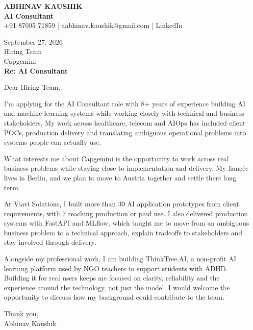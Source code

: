 \documentclass[10pt,a4paper]{article}
\begin{document}
\begin{center}
{\Large\bfseries ABHINAV KAUSHIK}\\[2pt]
{\bfseries AI Consultant}\\[2pt]
+91 87005 71859 \quad | \quad aabhinav.kaushik@gmail.com \quad | \quad LinkedIn
\end{center}
\vspace{8pt}
September 27, 2026\\[6pt]
Hiring Team\\
Capgemini\\[4pt]
\textbf{Re: AI Consultant}

Dear Hiring Team,

I’m applying for the AI Consultant role with 8+ years of experience building AI and machine learning systems while working closely with technical and business stakeholders. My work across healthcare, telecom and AIOps has included client POCs, production delivery and translating ambiguous operational problems into systems people can actually use.

What interests me about Capgemini is the opportunity to work across real business problems while staying close to implementation and delivery. My fiancée lives in Berlin, and we plan to move to Austria together and settle there long term.

At Viavi Solutions, I built more than 30 AI application prototypes from client requirements, with 7 reaching production or paid use. I also delivered production systems with FastAPI and MLflow, which taught me to move from an ambiguous business problem to a technical approach, explain tradeoffs to stakeholders and stay involved through delivery.

Alongside my professional work, I am building ThinkTree.AI, a non-profit AI learning platform used by NGO teachers to support students with ADHD. Building it for real users keeps me focused on clarity, reliability and the experience around the technology, not just the model. I would welcome the opportunity to discuss how my background could contribute to the team.

Thank you,\\
Abhinav Kaushik
\end{document}
